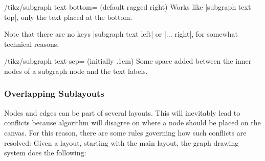 \begin{key}{/tikz/subgraph text bottom= (default ragged right)}
  Works like |subgraph text top|, only the text placed at the bottom. 
\end{key}

Note that there are no keys |subgraph text left| or |... right|,
for somewhat technical reasons.

\begin{key}{/tikz/subgraph text sep= (initially .1em)}
  Some space added between the inner nodes of a subgraph node and the
  text labels.
\end{key}


\subsubsection{Overlapping Sublayouts}

Nodes and edges can be part of several layouts. This
will inevitably lead to conflicts because algorithm will disagree on
where a node should be placed on the canvas. For this reason, there
are some rules governing how such conflicts are resolved: Given a
layout, starting with the main layout, the graph drawing system does
the following: 

